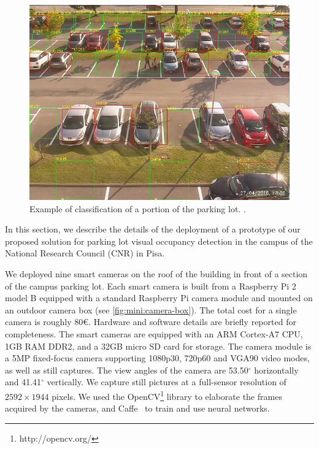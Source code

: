 \begin{figure}
	\centering
	\includegraphics[width=\columnwidth,trim={0 0 0 3.5ex},clip]{detection-example}
    \caption{Example of classification of a portion of the parking lot. .}
	\label{fig:mini:detection-example}
\end{figure}

In this section, we describe the details of the deployment of a prototype of our proposed solution for parking lot visual occupancy detection in the campus of the National Research Council (CNR) in Pisa.

We deployed nine smart cameras on the roof of the building in front of a section of the campus parking lot.
Each smart camera is built from a Raspberry Pi 2 model B equipped with a standard Raspberry Pi camera module and mounted on an outdoor camera box (see \ref{fig:mini:camera-box}).
The total cost for a single camera is roughly 80\euro.
Hardware and software details are briefly reported for completeness.
The smart cameras are equipped with an ARM Cortex-A7 CPU, 1GB RAM DDR2, and a 32GB micro SD card for storage.
The camera module is a 5MP fixed-focus camera supporting 1080p30, 720p60 and VGA90 video modes, as well as still captures.
The view angles of the camera are 53.50$^{\circ}$ horizontally and 41.41$^{\circ}$ vertically.
We capture still pictures at a full-sensor resolution of $2592 \times 1944$ pixels.
We used the OpenCV\footnote{http://opencv.org/} library to elaborate the frames acquired by the cameras, and Caffe~\cite{jia2014caffe} to train and use neural networks.

